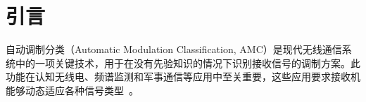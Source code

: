 \documentclass{article}
\begin{document}








\section{引言}
自动调制分类（Automatic Modulation Classification, AMC）是现代无线通信系统中的一项关键技术，用于在没有先验知识的情况下识别接收信号的调制方案。此功能在认知无线电、频谱监测和军事通信等应用中至关重要，这些应用要求接收机能够动态适应各种信号类型~\cite{dobre2007survey}。
\end{document}
